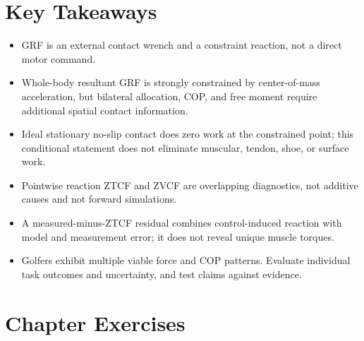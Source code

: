 \section{Key Takeaways}\label{grf-key-takeaways}

\begin{itemize}
\item
  GRF is an external contact wrench and a constraint reaction, not a direct motor command.
\item
  Whole-body resultant GRF is strongly constrained by center-of-mass acceleration, but bilateral allocation, COP, and free moment require additional spatial contact information.
\item
  Ideal stationary no-slip contact does zero work at the constrained point; this conditional statement does not eliminate muscular, tendon, shoe, or surface work.
\item
  Pointwise reaction ZTCF and ZVCF are overlapping diagnostics, not additive causes and not forward simulations.
\item
  A measured-minus-ZTCF residual combines control-induced reaction with model and measurement error; it does not reveal unique muscle torques.
\item
  Golfers exhibit multiple viable force and COP patterns. Evaluate individual task outcomes and uncertainty, and test claims against evidence.
\end{itemize}

\section{Chapter Exercises}\label{grf-chapter-exercises}

